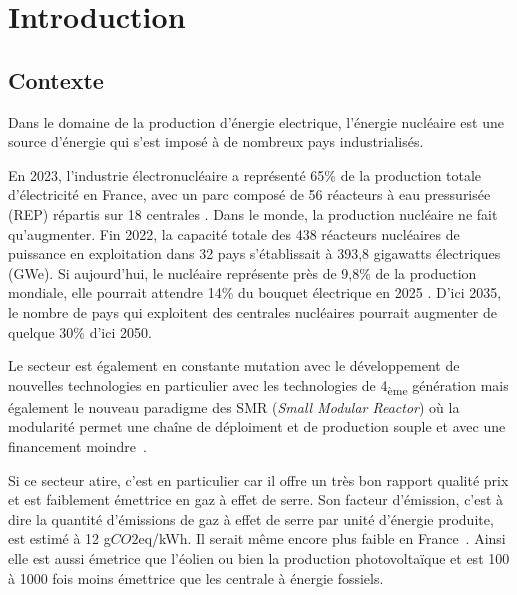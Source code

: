 
\chapter{Introduction}

\section*{Contexte}

Dans le domaine de la production d'énergie electrique, l'énergie nucléaire est une source d'énergie qui s'est imposé à de nombreux pays industrialisés.

En 2023, l'industrie électronucléaire a représenté 65\% de la production totale d'électricité en France, avec un parc composé de 56 réacteurs à eau pressurisée (REP) répartis sur 18 centrales \cite{rte2023}. Dans le monde, la production nucléaire ne fait qu'augmenter. Fin 2022, la capacité totale des 438 réacteurs nucléaires de puissance en exploitation dans 32 pays s’établissait à 393,8 gigawatts électriques (GWe). Si aujourd'hui, le nucléaire représente près de 9,8\% de la production mondiale, elle pourrait attendre 14\% du bouquet électrique en 2025 \cite{aiea2023}. D'ici 2035, le nombre de pays qui exploitent des centrales nucléaires pourrait augmenter de quelque 30\% d'ici 2050.

Le secteur est également en constante mutation avec le développement de nouvelles technologies en particulier avec les technologies de 4\textsubscript{ème} génération mais également le nouveau paradigme des SMR (\textit{Small Modular Reactor}) où la modularité permet une chaîne de déploiment et de production souple et avec une financement moindre~\cite{academie2022}.

Si ce secteur atire, c'est en particulier car il offre un très bon rapport qualité prix et est faiblement émettrice en gaz à effet de serre. Son facteur d'émission, c'est à dire la quantité d'émissions de gaz à effet de serre par unité d'énergie produite, est estimé à 12 g$CO2$eq/kWh. Il serait même encore plus faible en France~\cite{schlomer_technology-specific_nodate}. Ainsi elle est aussi émetrice que l'éolien ou bien la production photovoltaïque et est 100 à 1000 fois moins émettrice que les centrale à énergie fossiels.

